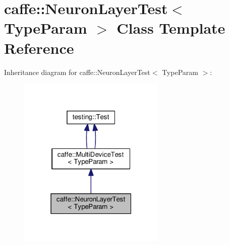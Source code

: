 \hypertarget{classcaffe_1_1_neuron_layer_test}{}\section{caffe\+:\+:Neuron\+Layer\+Test$<$ Type\+Param $>$ Class Template Reference}
\label{classcaffe_1_1_neuron_layer_test}


Inheritance diagram for caffe\+:\+:Neuron\+Layer\+Test$<$ Type\+Param $>$\+:
\nopagebreak
\begin{figure}[H]
\begin{center}
\leavevmode
\includegraphics[width=199pt]{classcaffe_1_1_neuron_layer_test__inherit__graph}
\end{center}
\end{figure}
